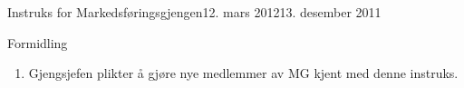 \documentclass[../../fsbok.tex]{subfiles}
\begin{document}
\begin{instruks}{Instruks for Markedsføringsgjengen}{12. mars 2012}{13. desember 2011 }
    \begin{instruksledd}{Formidling}
        \begin{enumerate}
            \item Gjengsjefen plikter å gjøre nye medlemmer av MG kjent med denne instruks.
        \end{enumerate}
    \end{instruksledd}


\end{instruks}
\end{document}
